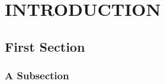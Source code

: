 
\chapter{INTRODUCTION}\label{intro}

\section{First Section}



\lipsum[1-2]

\subsection{A Subsection}



\lipsum[3-4]


